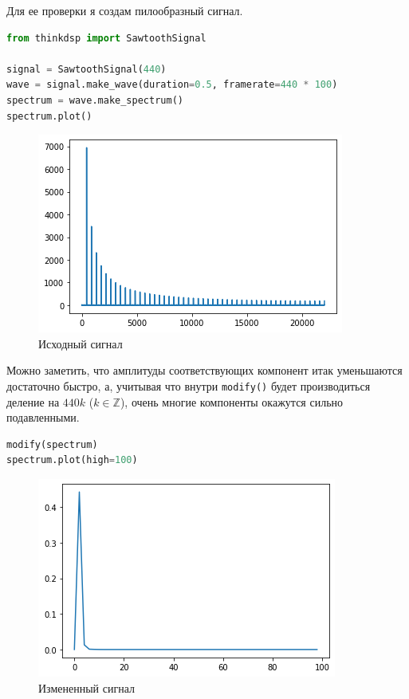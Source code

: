 \documentclass[a4paper,12pt]{report}
\begin{document}
    Для ее проверки я создам пилообразный сигнал.
    
\begin{lstlisting}[language=Python,caption=Исходный сигнал]
from thinkdsp import SawtoothSignal

signal = SawtoothSignal(440)
wave = signal.make_wave(duration=0.5, framerate=440 * 100)
spectrum = wave.make_spectrum()
spectrum.plot()
\end{lstlisting}

    \begin{figure}[H]
        \centering
        \includegraphics[width=\textwidth]{ex5_source.png}
        \caption{Исходный сигнал}
        \label{fig:ex5_source}
    \end{figure}
    
    Можно заметить, что амплитуды соответствующих компонент итак уменьшаются достаточно быстро, а, учитывая что внутри \texttt{modify()} будет производиться деление на $440k$ ($k \in \mathbb{Z}$), очень многие компоненты окажутся сильно подавленными.
    
\begin{lstlisting}[language=Python,caption=После \texttt{modify()}]
modify(spectrum)
spectrum.plot(high=100)
\end{lstlisting}

    \begin{figure}[H]
        \centering
        \includegraphics[width=\textwidth]{ex5_modified.png}
        \caption{Измененный сигнал}
        \label{fig:ex5_modified}
    \end{figure}
    
\end{document}
